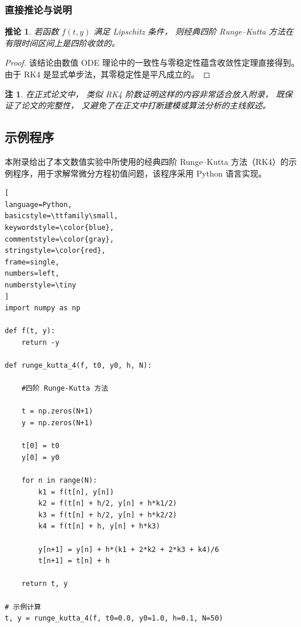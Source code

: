 \documentclass[UTF8, a4paper, zihao=-4]{ctexart} %
\newtheorem{corollary}{推论}[section]
\newtheorem{rmk}{注}[section]
\numberwithin{equation}{section}%
\begin{document}
\subsubsection*{直接推论与说明}

\begin{corollary}
若函数 $f(t,y)$ 满足 Lipschitz 条件，
则经典四阶 Runge--Kutta 方法在有限时间区间上是四阶收敛的。
\end{corollary}

\begin{proof}
该结论由数值 ODE 理论中的一致性与零稳定性蕴含收敛性定理直接得到。
由于 RK4 是显式单步法，其零稳定性是平凡成立的。
\end{proof}

\begin{rmk}
在正式论文中，
类似 RK4 阶数证明这样的内容非常适合放入附录，
既保证了论文的完整性，
又避免了在正文中打断建模或算法分析的主线叙述。
\end{rmk}

\subsection*{示例程序}
本附录给出了本文数值实验中所使用的经典四阶 Runge--Kutta 方法（RK4）的示例程序，用于求解常微分方程初值问题，该程序采用 Python 语言实现。
\begin{lstlisting}[
language=Python,
basicstyle=\ttfamily\small,
keywordstyle=\color{blue},
commentstyle=\color{gray},
stringstyle=\color{red},
frame=single,
numbers=left,
numberstyle=\tiny
]
import numpy as np

def f(t, y):
    return -y

def runge_kutta_4(f, t0, y0, h, N):

    #四阶 Runge-Kutta 方法

    t = np.zeros(N+1)
    y = np.zeros(N+1)
    
    t[0] = t0
    y[0] = y0

    for n in range(N):
        k1 = f(t[n], y[n])
        k2 = f(t[n] + h/2, y[n] + h*k1/2)
        k3 = f(t[n] + h/2, y[n] + h*k2/2)
        k4 = f(t[n] + h, y[n] + h*k3)

        y[n+1] = y[n] + h*(k1 + 2*k2 + 2*k3 + k4)/6
        t[n+1] = t[n] + h

    return t, y

# 示例计算
t, y = runge_kutta_4(f, t0=0.0, y0=1.0, h=0.1, N=50)
\end{lstlisting}
\end{document}
